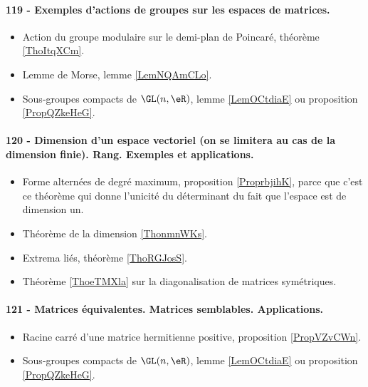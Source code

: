 \paragraph{119 - Exemples d’actions de groupes sur les espaces de matrices.}
\begin{itemize}
    \item Action du groupe modulaire sur le demi-plan de Poincaré, théorème \ref{ThoItqXCm}.
    \item Lemme de Morse, lemme \ref{LemNQAmCLo}.
    \item Sous-groupes compacts de \( \GL(n,\eR)\), lemme \ref{LemOCtdiaE} ou proposition \ref{PropQZkeHeG}.
\end{itemize}

\paragraph{120 - Dimension d’un espace vectoriel (on se limitera au cas de la dimension finie). Rang. Exemples et applications.}
\begin{itemize}
    \item Forme alternées de degré maximum, proposition \ref{ProprbjihK}, parce que c'est ce théorème qui donne l'unicité du déterminant du fait que l'espace est de dimension un.
    \item Théorème de la dimension \ref{ThonmnWKs}.
    \item Extrema liés, théorème \ref{ThoRGJosS}.
    \item Théorème \ref{ThoeTMXla} sur la diagonalisation de matrices symétriques.
\end{itemize}
\paragraph{121 - Matrices équivalentes. Matrices semblables. Applications.}
\begin{itemize}
    \item Racine carré d'une matrice hermitienne positive, proposition \ref{PropVZvCWn}.
    \item Sous-groupes compacts de \( \GL(n,\eR)\), lemme \ref{LemOCtdiaE} ou proposition \ref{PropQZkeHeG}.
\end{itemize}
